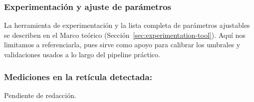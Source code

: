 \subsubsection{Experimentación y ajuste de parámetros}
\noindent
La herramienta de experimentación y la lista completa de parámetros ajustables se describen en el Marco teórico
(Sección~\ref{sec:experimentation-tool}). Aquí nos limitamos a referenciarla, pues sirve como apoyo para calibrar
los umbrales y validaciones usados a lo largo del pipeline práctico.

\subsubsection{Mediciones en la retícula detectada:}
Pendiente de redacción.
